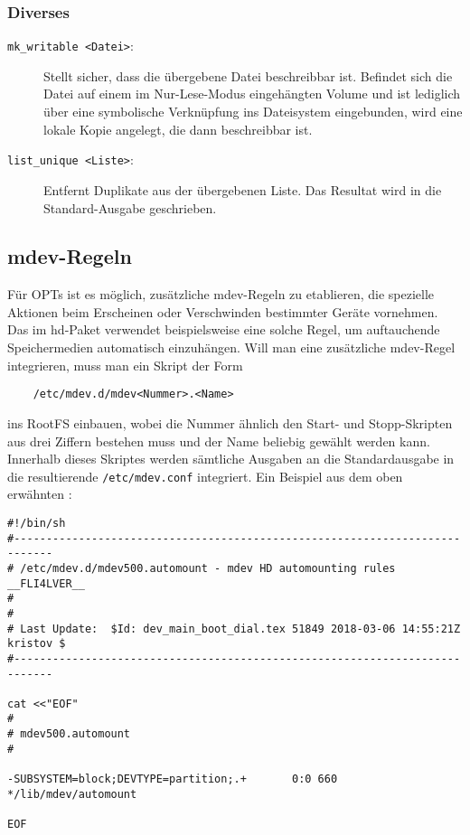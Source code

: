 \subsubsection{Diverses}

\begin{description}

\item[\texttt{mk\_writable <Datei>}:]
Stellt sicher, dass die übergebene Datei beschreibbar ist. Befindet sich die
Datei auf einem im Nur-Lese-Modus eingehängten Volume und ist lediglich über
eine symbolische Verknüpfung ins Dateisystem eingebunden, wird eine lokale Kopie
angelegt, die dann beschreibbar ist.

\item[\texttt{list\_unique <Liste>}:]
Entfernt Duplikate aus der übergebenen Liste. Das Resultat wird in die
Standard-Ausgabe geschrieben.

\end{description}

\subsection{mdev-Regeln}

Für OPTs ist es möglich, zusätzliche mdev-Regeln zu etablieren, die spezielle
Aktionen beim Erscheinen oder Verschwinden bestimmter Geräte vornehmen. Das
 im hd-Paket verwendet beispielsweise eine solche Regel,
um auftauchende Speichermedien automatisch einzuhängen. Will man eine
zusätzliche mdev-Regel integrieren, muss man ein Skript der Form

\begin{verbatim}
    /etc/mdev.d/mdev<Nummer>.<Name>
\end{verbatim}

ins RootFS einbauen, wobei die Nummer ähnlich den Start- und Stopp-Skripten aus
drei Ziffern bestehen muss und der Name beliebig gewählt werden kann. Innerhalb
dieses Skriptes werden sämtliche Ausgaben an die Standardausgabe in die
resultierende \texttt{/etc/mdev.conf} integriert. Ein Beispiel aus dem oben
erwähnten :

\begin{small}
\begin{verbatim}
#!/bin/sh
#----------------------------------------------------------------------------
# /etc/mdev.d/mdev500.automount - mdev HD automounting rules     __FLI4LVER__
#
#
# Last Update:  $Id: dev_main_boot_dial.tex 51849 2018-03-06 14:55:21Z kristov $
#----------------------------------------------------------------------------

cat <<"EOF"
#
# mdev500.automount
#

-SUBSYSTEM=block;DEVTYPE=partition;.+       0:0 660 */lib/mdev/automount

EOF
\end{verbatim}
\end{small}

